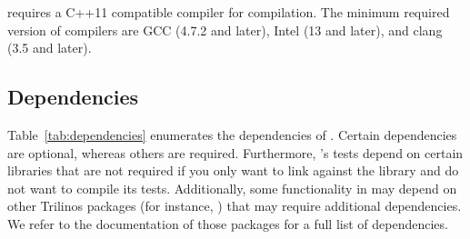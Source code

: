 \ifpacktwo{} requires a C++11 compatible compiler for compilation. The
minimum required version of compilers are GCC (4.7.2 and later),
Intel (13 and later), and clang (3.5 and later).

\subsection{Dependencies}

Table~\ref{tab:dependencies} enumerates the dependencies of \ifpacktwo. Certain
dependencies are optional, whereas others are required.  Furthermore,
\ifpacktwo's tests depend on certain libraries that are not required if you only
want to link against the \ifpacktwo library and do not want to compile its
tests. Additionally, some functionality in \ifpacktwo{} may depend on other
Trilinos packages (for instance, \amesostwo{}) that may require additional
dependencies. We refer to the documentation of those packages for a full list of
dependencies.

